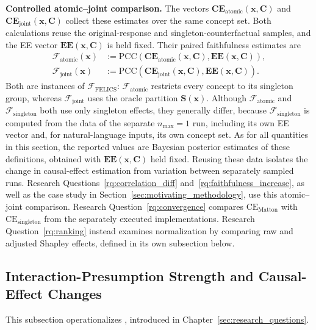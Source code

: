 \noindent\textbf{Controlled atomic--joint comparison.} The vectors $\mathbf{CE}_{\mathrm{atomic}}(\mathbf{x},\mathbf{C})$ and $\mathbf{CE}_{\mathrm{joint}}(\mathbf{x},\mathbf{C})$ collect these estimates over the same concept set. Both calculations reuse the original-response and singleton-counterfactual samples, and the EE vector $\mathbf{EE}(\mathbf{x},\mathbf{C})$ is held fixed. Their paired faithfulness estimates are
\begin{align}
	\label{eq:evaluation_f_atomic}
	\mathcal{F}_{\mathrm{atomic}}(\mathbf{x})
	 & :=\mathrm{PCC}\left(\mathbf{CE}_{\mathrm{atomic}}(\mathbf{x},\mathbf{C}),\mathbf{EE}(\mathbf{x},\mathbf{C})\right), \\
	\label{eq:evaluation_f_joint}
	\mathcal{F}_{\mathrm{joint}}(\mathbf{x})
	 & :=\mathrm{PCC}\left(\mathbf{CE}_{\mathrm{joint}}(\mathbf{x},\mathbf{C}),\mathbf{EE}(\mathbf{x},\mathbf{C})\right).
\end{align}
Both are instances of $\mathcal{F}_{\mathrm{FELICS}}$: $\mathcal{F}_{\mathrm{atomic}}$ restricts every concept to its singleton group, whereas $\mathcal{F}_{\mathrm{joint}}$ uses the oracle partition $\mathbf{S}(\mathbf{x})$. Although $\mathcal{F}_{\mathrm{atomic}}$ and $\mathcal{F}_{\mathrm{singleton}}$ both use only singleton effects, they generally differ, because $\mathcal{F}_{\mathrm{singleton}}$ is computed from the data of the separate $n_{\max}=1$ run, including its own EE vector and, for natural-language inputs, its own concept set. As for all quantities in this section, the reported values are Bayesian posterior estimates of these definitions, obtained with $\mathbf{EE}(\mathbf{x},\mathbf{C})$ held fixed.
Reusing these data isolates the change in causal-effect estimation from variation between separately sampled runs. Research Questions~\ref{rq:correlation_diff} and~\ref{rq:faithfulness_increase}, as well as the case study in Section~\ref{sec:motivating_methodology}, use this atomic--joint comparison. Research Question~\ref{rq:convergence} compares $\mathrm{CE}_{\mathrm{Matton}}$ with $\mathrm{CE}_{\mathrm{singleton}}$ from the separately executed implementations. Research Question~\ref{rq:ranking} instead examines normalization by comparing raw and adjusted Shapley effects, defined in its own subsection below.

\subsection{Interaction-Presumption Strength and Causal-Effect Changes}
This subsection operationalizes , introduced in Chapter~\ref{sec:research_questions}.

